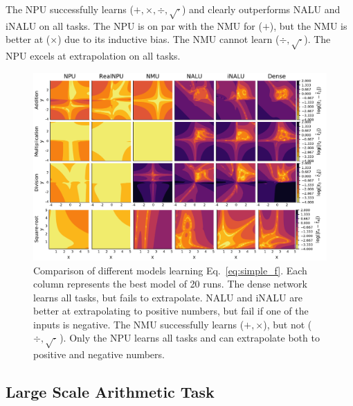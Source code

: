 \documentclass[9pt]{article}
\begin{document}
The NPU successfully learns ($+,\times,\div,\sqrt{\cdot}$) and clearly
outperforms NALU and iNALU on all tasks.  The NPU is on par with the NMU for
($+$), but the NMU is better at ($\times$) due to its inductive bias. The NMU
cannot learn ($\div,\sqrt{\cdot}$). The NPU excels at extrapolation on all tasks.
\begin{figure}
  \centering
  \includegraphics[width=0.7\linewidth]{simple_err.pdf}
  \caption{Comparison of different models learning Eq.~\ref{eq:simple_f}. Each
  column represents the best model of 20 runs.  The dense network learns all
  tasks, but fails to extrapolate. NALU and iNALU are better at extrapolating
  to positive numbers, but fail if one of the inputs is negative.  The NMU
  successfully learns ($+,\times$), but not ($\div,\sqrt{\cdot}\,$). Only the NPU
  learns all tasks and can extrapolate both to positive and negative numbers.
  }%
  \label{fig:simple_err}
\end{figure}

\subsection{Large Scale Arithmetic Task}%
\label{sub:large_scale_arithmetic_task}
\end{document}
